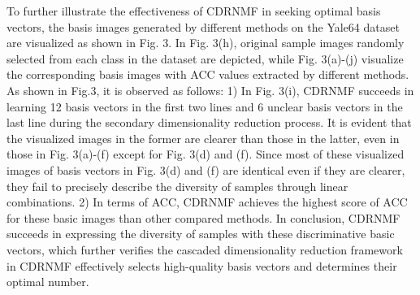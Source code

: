 \documentclass[a4paper,fleqn]{cas-sc}
\begin{document}
To further illustrate the effectiveness of CDRNMF in seeking optimal basis vectors, the basis images generated by different methods on the Yale64 dataset are visualized as shown in Fig. 3. In Fig. 3(h), original sample images randomly selected from each class in the dataset are depicted, while Fig. 3(a)-(j) visualize the corresponding basis images with ACC values extracted by different methods. As shown in Fig.3, it is observed as follows: 1) In Fig. 3(i), CDRNMF succeeds in learning 12 basis vectors in the first two lines and 6 unclear basis vectors in the last line during the secondary dimensionality reduction process. It is evident that the visualized images in the former are clearer than those in the latter, even in those in Fig. 3(a)-(f) except for Fig. 3(d) and (f). Since most of these visualized images of basis vectors in Fig. 3(d) and (f) are identical even if they are clearer, they fail to precisely describe the diversity of samples through linear combinations. 2) In terms of ACC, CDRNMF achieves the highest score of ACC for these basic images than other compared methods. In conclusion, CDRNMF succeeds in expressing the diversity of samples with these discriminative basic vectors, which further verifies the cascaded dimensionality reduction framework in CDRNMF effectively selects high-quality basis vectors and determines their optimal number.
\end{document}
